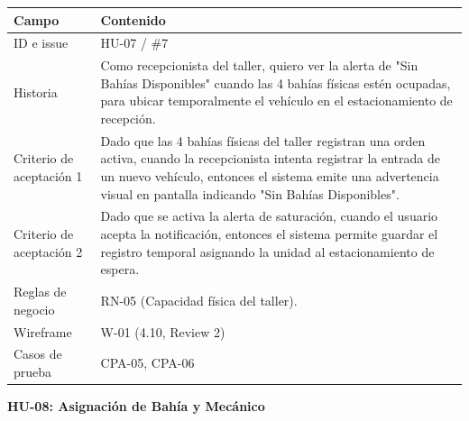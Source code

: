{\def\LTcaptype{none} %
\begin{longtable}[]{@{}
  >{\raggedright\arraybackslash}p{}
  >{\raggedright\arraybackslash}p{}@{}}
\toprule\noalign{}
\begin{minipage}[b]{\linewidth}\raggedright
\textbf{Campo}
\end{minipage} & \begin{minipage}[b]{\linewidth}\raggedright
\textbf{Contenido}
\end{minipage} \\
\midrule\noalign{}
\endhead
\bottomrule\noalign{}
\endlastfoot
ID e issue & HU-07 / \#7 \\
Historia & Como recepcionista del taller, quiero ver la alerta de "Sin
Bahías Disponibles" cuando las 4 bahías físicas estén ocupadas, para
ubicar temporalmente el vehículo en el estacionamiento de recepción. \\
Criterio de aceptación 1 & Dado que las 4 bahías físicas del taller
registran una orden activa, cuando la recepcionista intenta registrar la
entrada de un nuevo vehículo, entonces el sistema emite una advertencia
visual en pantalla indicando "Sin Bahías Disponibles". \\
Criterio de aceptación 2 & Dado que se activa la alerta de saturación,
cuando el usuario acepta la notificación, entonces el sistema permite
guardar el registro temporal asignando la unidad al estacionamiento de
espera. \\
Reglas de negocio & RN-05 (Capacidad física del taller). \\
Wireframe & W-01 (4.10, Review 2) \\
Casos de prueba & CPA-05, CPA-06 \\
\end{longtable}
}

\textbf{HU-08: Asignación de Bahía y Mecánico}

